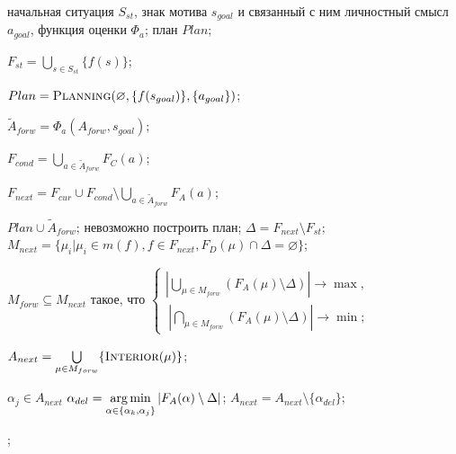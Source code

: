 	\Require начальная ситуация $S_{st}$, знак мотива $s_{goal}$ и связанный с ним личностный смысл $a_{goal}$, функция оценки $\Phi_a$;
	\Ensure план $Plan$;
	
	\State $F_{st}=\bigcup\limits_{s\in S_{st}}\{f(s)\}$; 
			
	\State $Plan=\Call{Planning}{\varnothing, \{f(s_{goal})\}, \{a_{goal}\}}$;

		\State $\tilde A_{forw}=\Phi_a(A_{forw},s_{goal})$; 
		
		\State $F_{cond} = \bigcup\limits_{a\in \tilde A_{forw}}F_C(a)$;

		\State $F_{next}=F_{cur}\cup F_{cond}\setminus\bigcup\limits_{a\in \tilde A_{forw}}F_A(a)$; 
		
			\State \Return $Plan\cup{\tilde A_{forw}}$;		
		\Else
				\State\Return невозможно построить план;
			\Else
				\State $\Delta=F_{next}\setminus F_{st}$; 					
				\State $M_{next}=\{\mu_i | \mu_i\in m(f), f\in F_{next},F_D(\mu)\cap\Delta=\varnothing\}$;
				
				\State $M_{forw}\subseteq M_{next}$ такое, что $\begin{cases}
				\left|\bigcup\limits_{\mu\in M_{forw}}\left(F_A(\mu)\setminus\Delta\right)\right|\rightarrow\max,\\
				\ \left|\bigcap\limits_{\mu\in M_{forw}}\left(F_A(\mu)\setminus\Delta\right)\right|\rightarrow\min;
				\end{cases}$ 
				
				\State $A_{next} = \bigcup\limits_{\mu\in M_{forw}}\{\Call{Interior}{\mu}\}$; 
				
				\ForAll $\alpha_j\in A_{next}$
						\State $\alpha_{del}=\operatorname*{arg\,min}\limits_{\alpha\in\{\alpha_k,\alpha_j\}}|F_A(\alpha)\setminus\Delta|$;
						\State $A_{next}= A_{next}\setminus\{\alpha_{del}\}$; 
					\EndIf
				\EndFor
				
				\State \Return {};						
			\EndIf
		\EndIf

	\EndFunction